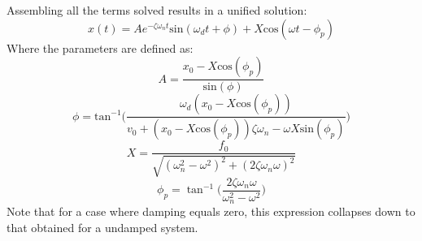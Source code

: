 \documentclass[12pt,letter]{article}
\begin{document}
	Assembling all the terms solved results in a unified solution:
	\begin{equation}
		x(t) = Ae^{-\zeta \omega_n t}\text{sin}(\omega_d t + \phi) +  X \text{cos}(\omega t - \phi_p)
		\label{eq:damped_forced_x}
	\end{equation}
	Where the parameters are defined as:
	\begin{equation}
		A = \frac{x_0 -X \text{cos}(\phi_p)}{\text{sin}(\phi)}
	\end{equation}			 
	\begin{equation}
		\phi =  \text{tan}^{-1}\bigg(\frac{\omega_d ( x_0 -X \text{cos}(\phi_p))}{v_0 + (x_0 - X \text{cos}(\phi_p)) \zeta \omega_n - \omega X \text{sin}(\phi_p) }\bigg)
	\end{equation}	
	\begin{equation}
		X = \frac{f_0}{\sqrt{(\omega_n^2 - \omega^2)^2 +  (2\zeta \omega_n \omega)^2}} 
	\end{equation}	
	\begin{equation}
		\phi_p = \tan^{-1} \bigg(\frac{2\zeta \omega_n \omega}{\omega_n^2 - \omega^2}\bigg)
		\label{eq:damped_forced_theta_p}
	\end{equation}		
	Note that for a case where damping equals zero, this expression collapses down to that obtained for a undamped system.
\end{document}

